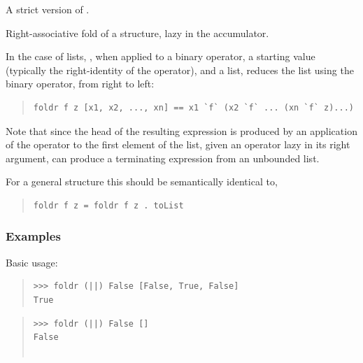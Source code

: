 \begin{haddockdesc}
\item[\begin{tabular}{@{}l}
foldl1' :: HasCallStack => (a -> a -> a) -> {\char 91}a{\char 93} -> a
\end{tabular}]
{\haddockbegindoc
A strict version of .\par}
\end{haddockdesc}
\begin{haddockdesc}
\item[\begin{tabular}{@{}l}
foldr :: Foldable t => (a -> b -> b) -> b -> t a -> b
\end{tabular}]
{\haddockbegindoc
Right-associative fold of a structure, lazy in the accumulator.\par
In the case of lists, , when applied to a binary operator, a
 starting value (typically the right-identity of the operator), and a
 list, reduces the list using the binary operator, from right to left:\par
\begin{quote}
{\haddockverb\begin{verbatim}
foldr f z [x1, x2, ..., xn] == x1 `f` (x2 `f` ... (xn `f` z)...)\end{verbatim}}
\end{quote}
Note that since the head of the resulting expression is produced by an
 application of the operator to the first element of the list, given an
 operator lazy in its right argument,  can produce a terminating
 expression from an unbounded list.\par
For a general  structure this should be semantically identical
 to,\par
\begin{quote}
{\haddockverb\begin{verbatim}
foldr f z = foldr f z . toList\end{verbatim}}
\end{quote}
\subsubsection*{\textbf{Examples}}
Basic usage:\par
\begin{quote}
{\haddockverb\begin{verbatim}
>>> foldr (||) False [False, True, False]
True

\end{verbatim}}
\end{quote}
\begin{quote}
{\haddockverb\begin{verbatim}
>>> foldr (||) False []
False


\end{verbatim}}
\end{quote}}
\end{haddockdesc}
